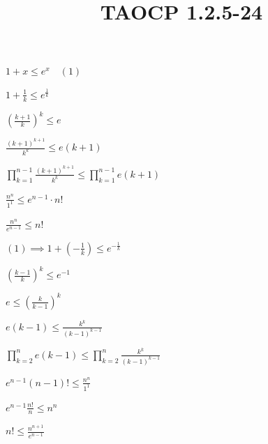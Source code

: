 \documentclass{article}
\title{TAOCP 1.2.5\mbox{-}24}
\begin{document}
\maketitle

\( 1 + x \leq e^{x}\quad (1) \)

\( 1 + \frac{1}{k} \leq e^{\frac{1}{k}} \)

\( {(\frac{k+1}{k})}^{k} \leq e \)

\( \frac{{(k+1)}^{k+1}}{k^{k}} \leq e (k+1) \)

\( \prod_{k=1}^{n-1} \frac{{(k+1)}^{k+1}}{k^{k}} \leq \prod_{k=1}^{n-1} e (k+1) \)

\( \frac{n^{n}}{1^{1}} \leq e^{n-1} \cdot n! \)

\( \frac{n^{n}}{e^{n-1}} \leq n! \)

\( (1) \implies 1 + (-\frac{1}{k}) \leq e^{-\frac{1}{k}} \)

\( {(\frac{k-1}{k})}^{k} \leq e^{-1} \)

\( e \leq {(\frac{k}{k-1})}^{k} \)

\( e(k-1) \leq \frac{k^{k}}{{(k-1)}^{k-1}} \)

\( \prod_{k=2}^{n} e(k-1) \leq \prod_{k=2}^{n} \frac{k^{k}}{{(k-1)}^{k-1}} \)

\( e^{n-1} (n-1)! \leq \frac{n^{n}}{1^{1}} \)

\( e^{n-1} \frac{n!}{n} \leq n^{n} \)

\( n! \leq \frac{n^{n+1}}{e^{n-1}} \)
\end{document}
